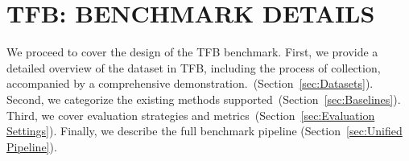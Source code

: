 \documentclass[sigconf, nonacm, pdfa]{acmart}
\begin{document}
\section{TFB: BENCHMARK DETAILS}
\label{sec:TFB}
We proceed to cover the design of the TFB benchmark. First, we provide a detailed overview of the dataset in TFB, including the process of collection, accompanied by a comprehensive demonstration.~(Section~\ref{sec:Datasets}). Second, we categorize the existing methods supported~(Section~\ref{sec:Baselines}). Third, we cover evaluation strategies and metrics~(Section~\ref{sec:Evaluation Settings}). Finally, we describe the full benchmark pipeline (Section~\ref{sec:Unified Pipeline}).  


\begin{table}[t]
\caption{Statistics of univariate datasets.}
\footnotesize
\label{Univariate datasets}
\setlength{\tabcolsep}{1.5pt}
\end{table}
\end{document}

